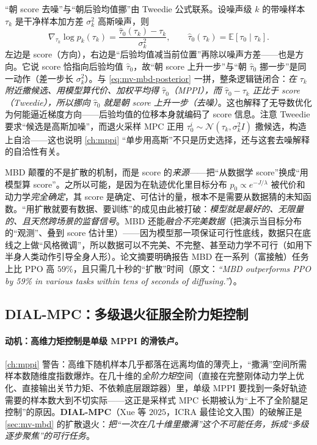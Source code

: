 \begin{derivation}
“朝 score 去噪”与“朝后验均值挪”由 Tweedie 公式联系。设噪声级 $k$ 的带噪样本 $\tau_k$ 是干净样本加方差 $\sigma_k^2$ 高斯噪声，则
\begin{equation}
  \nabla_{\tau_k}\log p_k(\tau_k)=\frac{\hat\tau_0(\tau_k)-\tau_k}{\sigma_k^2},\qquad \hat\tau_0(\tau_k)=\mathbb{E}[\tau_0\mid\tau_k].
  \label{eq:mv-tweedie}
\end{equation}
左边是 score（方向），右边是“后验均值减当前位置”再除以噪声方差——也是方向。它说 score 恰指向后验均值 $\hat\tau_0$，故“朝 score 上升一步”与“朝 $\hat\tau_0$ 挪一步”是同一动作（差一步长 $\sigma_k^2$）。与 \cref{eq:mv-mbd-posterior} 一拼，整条逻辑链闭合：\emph{在 $\tau_k$ 附近撒候选、用模型算代价、加权平均得 $\hat\tau_0$（MPPI），而 $\hat\tau_0-\tau_k$ 正比于 score（Tweedie），所以挪向 $\hat\tau_0$ 就是朝 score 上升一步（去噪）}。这也解释了无导数优化为何能逼近梯度方向——后验均值的位移本身就编码了 score 信息。注意 Tweedie 要求“候选是高斯加噪”，而退火采样 MPC 正用 $\tau_0^i\sim\mathcal{N}(\tau_k,\sigma_k^2 I)$ 撒候选，构造上自洽——这也说明 \cref{ch:mppi} “单步用高斯”不只是历史选择，还与这套去噪解释的自洽性有关。
\end{derivation}

\begin{insight}
MBD 颠覆的不是扩散的机制，而是 score 的\emph{来源}——把“从数据学 score”换成“用模型算 score”。之所以可能，是因为在轨迹优化里目标分布 $p_0\propto e^{-J/\lambda}$ 被代价和动力学\emph{完全确定}，其 score 是确定、可估计的量，根本不是需要从数据猜的未知函数。“用扩散就要有数据、要训练”的成见由此被打破：\emph{模型就是最好的、无限量的、且天然跨场景的监督信号}。MBD 还能\emph{融合不完美数据}（把演示当目标分布的“观测”、叠到 score 估计里）——因为模型那一项保证可行性底线，数据只在底线之上做“风格微调”，所以数据可以不完美、不完整、甚至动力学不可行（如用下半身人类动作引导全身人形）。论文摘要明确报告 MBD 在一系列（富接触）任务上比 PPO 高 $59\%$，且只需几十秒的“扩散”时间\cite{pan2024mbd}（原文：\emph{“MBD outperforms PPO by 59\% in various tasks within tens of seconds of diffusing.”}）。
\end{insight}

\subsection{DIAL-MPC：多级退火征服全阶力矩控制}
\label{sec:mv-dial}

\paragraph{动机：高维力矩控制是单级 MPPI 的滑铁卢。}
\cref{ch:mppi} 警告：高维下随机样本几乎都落在远离均值的薄壳上，“撒满”空间所需样本数随维度指数爆炸。在几十维的\emph{全阶力矩}空间（直接在完整刚体动力学上优化、直接输出关节力矩、不依赖底层跟踪器）里，单级 MPPI 要找到一条好轨迹需要的样本数大到不切实际——这正是采样式 MPC 长期被认为“上不了全阶腿足控制”的原因。\textbf{DIAL-MPC}（Xue 等 $2025$，ICRA 最佳论文入围）的破解正是 \cref{sec:mv-mbd} 的扩散退火：\emph{把“一次在几十维里撒满”这个不可能任务，拆成“多级逐步聚焦”的可行任务}\cite{xue2025dial}。

